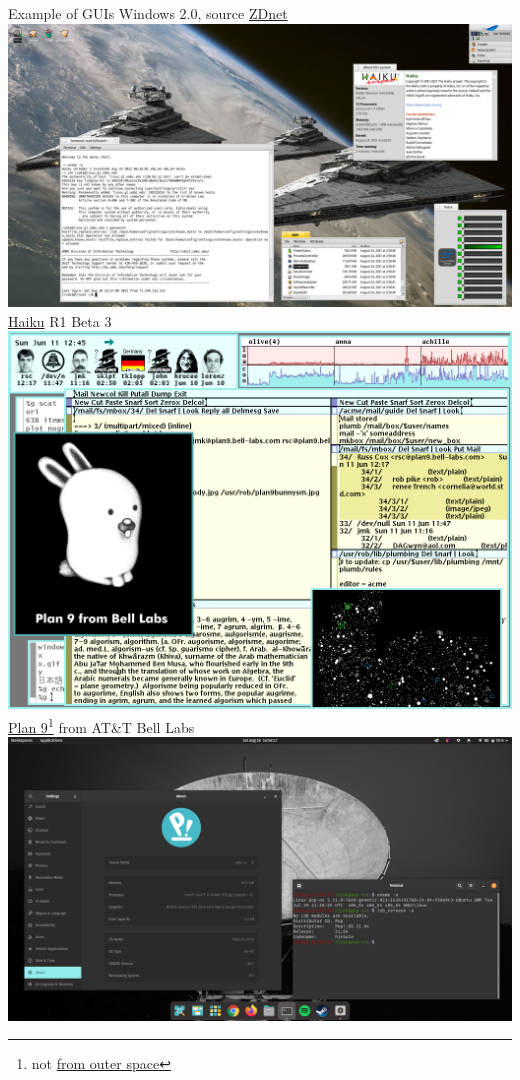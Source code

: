 \documentclass[graphics]{beamer}
\begin{document}
\begin{frame}{Example of GUIs}
{        \footnotesize{Windows 2.0, source \href{https://www.zdnet.com/pictures/windows-1-0-to-10-the-changing-face-of-microsofts-landmark-os/8/}{ZDnet}}
    }
     {
        \includegraphics[scale=0.183]{L03_OperatingSystems/L3_Haiku.png}
        \footnotesize{\href{https://www.haiku-os.org/}{Haiku} R1 Beta 3}
    }
     {
        \includegraphics[scale=0.27]{L03_OperatingSystems/L03_plan9.png} \\
        \footnotesize{\href{https://en.wikipedia.org/wiki/Plan_9_from_Bell_Labs}{Plan 9}\footnote{not \href{https://en.wikipedia.org/wiki/Plan_9_from_Outer_Space}{from outer space}} from AT\&T Bell Labs}
    }
     {
        \includegraphics[scale=0.183]{L03_OperatingSystems/L03_popos.png}
}
\end{frame}
\end{document}
